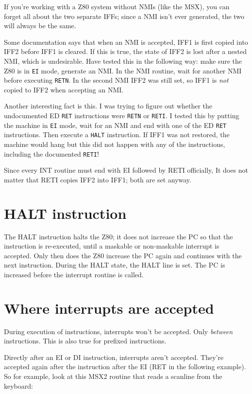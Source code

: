\documentclass[oneside,a4paper]{book}
\begin{document}
If you're working with a Z80 system without NMIs (like the MSX), you can 
forget all about the two separate IFFs; since a NMI isn't ever generated, 
the two will always be the same. 

Some documentation says that when an NMI is accepted, IFF1 is first copied
into IFF2 before IFF1 is cleared. If this is true, the state of IFF2
is lost after a nested NMI, which is undesirable. Have tested this in the
following way: make sure the Z80 is in {\tt EI} mode, generate an NMI.
In the NMI routine, wait for another NMI before executing {\tt RETN}. In
the second NMI IFF2 was still set, so IFF1 is {\em not} copied to
IFF2 when accepting an NMI.

Another interesting fact is this. I was trying to figure out whether 
the undocumented ED {\tt RET} instructions were {\tt RETN} or {\tt RETI}.
I tested this by putting the machine in {\tt EI} mode, wait for an
NMI and end with one of the ED {\tt RET} instructions. Then execute
a {\tt HALT} instruction. If IFF1 was not restored, the machine would
hang but this did not happen with any of the instructions, including
the documented {\tt RETI}!

Since every INT routine must end with {\ttfamily EI} followed by 
{\ttfamily RETI} officially, It does not matter that RETI copies IFF2 into 
IFF1; both are set anyway.

\section{HALT instruction}

The HALT instruction halts the Z80; it does not increase the PC so
that the instruction is re-executed, until a maskable or non-maskable 
interrupt is accepted. Only then does the Z80 increase the PC again 
and continues with the next instruction. During the HALT state, the 
HALT line is set. The PC is increased before the interrupt routine is called.

\section{Where interrupts are accepted}

During execution of instructions, interrupts won't be accepted. Only 
{\em between} instructions. This is also true for prefixed instructions.

Directly after an EI or DI instruction, interrupts aren't accepted. They're
accepted again after the instruction after the EI (RET in the following 
example). So for example, look at this MSX2 routine that reads a scanline 
from the keyboard:
\end{document}
